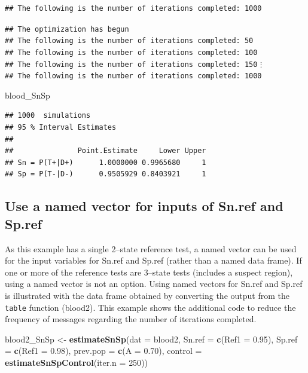 \documentclass[
  12pt,
]{article}
\newenvironment{Shaded}{\begin{snugshade}}{\end{snugshade}}
\newcommand{\AttributeTok}[1]{\textcolor[rgb]{0.13,0.29,0.53}{#1}}
\newcommand{\DecValTok}[1]{\textcolor[rgb]{0.00,0.00,0.81}{#1}}
\newcommand{\FloatTok}[1]{\textcolor[rgb]{0.00,0.00,0.81}{#1}}
\newcommand{\FunctionTok}[1]{\textcolor[rgb]{0.13,0.29,0.53}{\textbf{#1}}}
\newcommand{\NormalTok}[1]{#1}
\newcommand{\OtherTok}[1]{\textcolor[rgb]{0.56,0.35,0.01}{#1}}
\begin{document}
\begin{verbatim}
## The following is the number of iterations completed: 1000
\end{verbatim}

\texttt{\#\#\ The\ optimization\ has\ begun}
\texttt{\#\#\ The\ following\ is\ the\ number\ of\ iterations\ completed:\ 50}
\texttt{\#\#\ The\ following\ is\ the\ number\ of\ iterations\ completed:\ 100}
\texttt{\#\#\ The\ following\ is\ the\ number\ of\ iterations\ completed:\ 150}
\(\vdots\)
\texttt{\#\#\ The\ following\ is\ the\ number\ of\ iterations\ completed:\ 1000}

\begin{Shaded}
\begin{Highlighting}[]
\NormalTok{blood\_SnSp}
\end{Highlighting}
\end{Shaded}

\begin{verbatim}
## 1000  simulations 
## 95 % Interval Estimates
## 
##               Point.Estimate     Lower Upper
## Sn = P(T+|D+)      1.0000000 0.9965680     1
## Sp = P(T-|D-)      0.9505929 0.8403921     1
\end{verbatim}

\subsection{Use a named vector for inputs of Sn.ref and
Sp.ref}\label{use-a-named-vector-for-inputs-of-sn.ref-and-sp.ref}

As this example has a single 2--state reference test, a named vector can
be used for the input variables for Sn.ref and Sp.ref (rather than a
named data frame). If one or more of the reference tests are 3--state
tests (includes a suspect region), using a named vector is not an
option. Using named vectors for Sn.ref and Sp.ref is illustrated with
the data frame obtained by converting the output from the \texttt{table}
function (blood2). This example shows the additional code to reduce the
frequency of messages regarding the number of iterations completed.

\begin{Shaded}
\begin{Highlighting}[]
\NormalTok{blood2\_SnSp }\OtherTok{\textless{}{-}} \FunctionTok{estimateSnSp}\NormalTok{(}\AttributeTok{dat =}\NormalTok{ blood2,}
                           \AttributeTok{Sn.ref =} \FunctionTok{c}\NormalTok{(}\AttributeTok{Ref1 =} \FloatTok{0.95}\NormalTok{),}
                           \AttributeTok{Sp.ref =} \FunctionTok{c}\NormalTok{(}\AttributeTok{Ref1 =} \FloatTok{0.98}\NormalTok{),}
                           \AttributeTok{prev.pop =} \FunctionTok{c}\NormalTok{(}\AttributeTok{A =} \FloatTok{0.70}\NormalTok{),}
                           \AttributeTok{control =} \FunctionTok{estimateSnSpControl}\NormalTok{(}\AttributeTok{iter.n =} \DecValTok{250}\NormalTok{))}
\end{Highlighting}
\end{Shaded}
\end{document}
